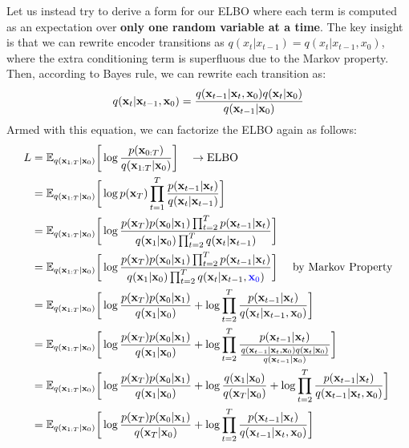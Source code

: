 Let us instead try to derive a form for our ELBO where each term is computed as an expectation over \textbf{only one random variable at a time}. The key insight is that we can rewrite encoder transitions as $q(x_t|x_{t-1}) = q(x_t|x_{t-1}, x_0)$, where the extra conditioning term is superfluous due to the Markov property. Then, according to Bayes rule, we can rewrite each transition as:
\begin{align*}
	q({\mathbf{x}}_t|{\mathbf{x}}_{t-1}, {\mathbf{x}}_0)= \frac{q({\mathbf{x}}_{t-1}|{\mathbf{x}}_t, {\mathbf{x}}_0)q({\mathbf{x}}_t| {\mathbf{x}}_0)}{q({\mathbf{x}}_{t-1}| {\mathbf{x}}_0)} 
\end{align*}
Armed with this equation, we can factorize the ELBO again as follows:
\begin{align}
		L &= \mathbb{E}_{q(\rvx_{1:T}|\rvx_0)}\bigg[\log\frac{p(\rvx_{0:T})}{q(\rvx_{1:T}|\rvx_0)}\bigg] \quad \to \textrm{ELBO}\\
		&= \mathbb{E}_{q(\rvx_{1:T}|\rvx_0)}\bigg[\log p(\rvx_T)\prod_{t=1}^T\frac{p(\rvx_{t-1}|\rvx_t)}{q(\rvx_{t}|\rvx_{t-1})}\bigg]\\
		&= \mathbb{E}_{q(\rvx_{1:T}|\rvx_0)}\bigg[\log \frac{p(\rvx_T)p(\rvx_0|\rvx_{1})\prod_{t=2}^{T} p(\rvx_{t-1}|\rvx_{t})}{q(\rvx_1|\rvx_{0})\prod_{t=2}^{T}  q(\rvx_{t}|\rvx_{t-1})}\bigg]\\
		&= \mathbb{E}_{q(\rvx_{1:T}|\rvx_0)}\bigg[\log \frac{p(\rvx_T)p(\rvx_0|\rvx_{1})\prod_{t=2}^{T} p(\rvx_{t-1}|\rvx_{t})}{q(\rvx_1|\rvx_{0})\prod_{t=2}^{T}  q(\rvx_{t}|\rvx_{t-1}, \blue{\rvx_0})}\bigg] \quad \textrm{ by Markov Property}\\
		&= \mathbb{E}_{q(\rvx_{1:T}|\rvx_0)}\bigg[\log \frac{p(\rvx_T)p(\rvx_0|\rvx_{1})}{q(\rvx_1|\rvx_{0})}+\log \prod_{t=2}^{T}\frac{ p(\rvx_{t-1}|\rvx_{t})}{q(\rvx_{t}|\rvx_{t-1}, \rvx_0)}\bigg]\\
		&= \mathbb{E}_{q(\rvx_{1:T}|\rvx_0)}\bigg[\log \frac{p(\rvx_T)p(\rvx_0|\rvx_{1})}{q(\rvx_1|\rvx_{0})}+\log \prod_{t=2}^{T}\frac{ p(\rvx_{t-1}|\rvx_{t})}{\frac{q(\rvx_{t-1}|\rvx_t, \rvx_0)q(\rvx_t| \rvx_0)}{q(\rvx_{t-1}| \rvx_0)}}\bigg]\\
		&= \mathbb{E}_{q(\rvx_{1:T}|\rvx_0)}\bigg[\log \frac{p(\rvx_T)p(\rvx_0|\rvx_{1})}{q(\rvx_1|\rvx_{0})}+\log \frac{q(\rvx_1|\rvx_0)}{q(\rvx_T|\rvx_0)}+\log \prod_{t=2}^{T}\frac{ p(\rvx_{t-1}|\rvx_{t})}{q(\rvx_{t-1}|\rvx_t, \rvx_0)}\bigg]\\
		&= \mathbb{E}_{q(\rvx_{1:T}|\rvx_0)}\bigg[\log \frac{p(\rvx_T)p(\rvx_0|\rvx_{1})}{q(\rvx_T|\rvx_{0})}+\log \prod_{t=2}^{T}\frac{ p(\rvx_{t-1}|\rvx_{t})}{q(\rvx_{t-1}|\rvx_t, \rvx_0)}\bigg]\\

\end{align}
